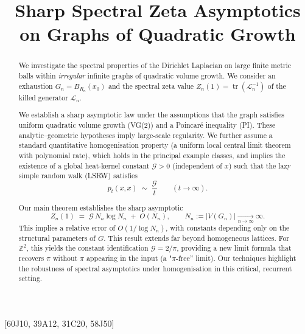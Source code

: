\documentclass{article}
\numberwithin{equation}{section}
\theoremstyle{definition}
\theoremstyle{remark}
\newcommand{\cG}{\mathcal{G}}
\DeclareMathOperator{\tr}{tr}
\newcommand{\LL}{\mathcal{L}}
\begin{document}
\title{Sharp Spectral Zeta Asymptotics on Graphs of Quadratic Growth}



[60J10, 39A12, 31C20, 58J50]

\begin{abstract}
We investigate the spectral properties of the Dirichlet Laplacian on large finite metric balls within \emph{irregular} infinite graphs of quadratic volume growth.
We consider an exhaustion $G_n=B_{R_n}(x_0)$ and the spectral zeta value
$Z_n(1)=\tr(\LL_n^{-1})$ of the killed generator $\LL_n$.

We establish a sharp asymptotic law under the assumptions that the graph satisfies uniform quadratic volume growth (VG(2)) and a Poincaré inequality (PI). These analytic–geometric hypotheses imply large-scale regularity. We further assume a standard quantitative homogenisation property (a uniform local central limit theorem with polynomial rate), which holds in the principal example classes, and implies the existence of a global heat-kernel constant $\cG>0$ (independent of $x$) such that the lazy simple random walk (LSRW) satisfies
\[
  p_t(x,x)\;\sim\;\frac{\cG}{t}\qquad(t\to\infty).
\]

Our main theorem establishes the sharp asymptotic
\[
  Z_n(1)\;=\;\cG\,N_n\log N_n\;+\; O(N_n),\qquad N_n:=|V(G_n)|\xrightarrow[n\to\infty]{}\infty.
\]
This implies a relative error of $O(1/\log N_n)$, with constants depending only on the structural parameters of $G$.
This result extends far beyond homogeneous lattices.
For $\mathbb Z^2$, this yields the constant identification $\cG = 2/\pi$, providing a new limit formula that recovers $\pi$ without $\pi$ appearing in the input (a "$\pi$-free'' limit).
Our techniques highlight the robustness of spectral asymptotics under homogenisation in this critical, recurrent setting.
\end{abstract}
\end{document}

